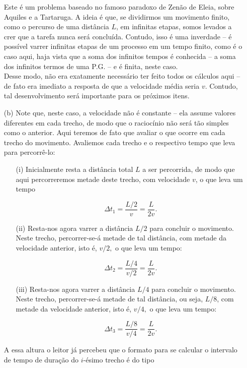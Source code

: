 \begin{exemplo}
\begin{itemize}
 Este é um problema baseado no famoso paradoxo de Zenão de Eleia, sobre Aquiles e a Tartaruga. A ideia é que, se dividirmos um movimento finito, como o percurso de uma distância $L$, em infinitas etapas, somos levados a crer que a tarefa nunca será concluída. Contudo, isso é uma inverdade -- é possível varrer infinitas etapas de um processo em um tempo finito, como é o caso aqui, haja vista que a soma dos infinitos tempos é conhecida -- a soma dos infinitos termos de uma P.G. -- e é finita, neste caso. \\

 Desse modo, não era exatamente necessário ter feito todos os cálculos aqui -- de fato era imediato a resposta de que a velocidade média seria $v.$ Contudo, tal desenvolvimento será importante para os próximos itens.
  
  \item [(b)] Note que, neste caso, a velocidade não é constante -- ela assume valores diferentes em cada trecho, de modo que o raciocínio não será tão simples como o anterior. Aqui teremos de fato que avaliar o que ocorre em cada trecho do movimento. Avaliemos cada trecho e o respectivo tempo que leva para percorrê-lo:

   \begin{enumerate}
    \item [(i)] Inicialmente resta a distância total $L$ a ser percorrida, de modo que aqui percorreremos metade deste trecho, com velocidade $v$, o que leva um tempo

    $$ \Delta t_1 = \dfrac{L/2}{v} = \dfrac{L}{2v}.$$


\item [(ii)] Resta-nos agora varrer a distância $L/2$ para concluir o movimento. Neste trecho, percorrer-se-á metade de tal distância, com metade da velocidade anterior, isto é, $v/2,$ o que leva um tempo:

$$ \Delta t_2 = \dfrac{L/4}{v/2} = \dfrac{L}{2v}.$$


\item [(iii)] Resta-nos agora varrer a distância $L/4$ para concluir o movimento. Neste trecho, percorrer-se-á metade de tal distância, ou seja, $L/8$, com metade da velocidade anterior, isto é, $v/4,$ o que leva um tempo:

$$ \Delta t_3 = \dfrac{L/8}{v/4} = \dfrac{L}{2v}.$$

    
\end{enumerate}


A essa altura o leitor já percebeu que o formato para se calcular o intervalo de tempo de duração do $i$-ésimo trecho é do tipo


\end{itemize}
\end{exemplo}
